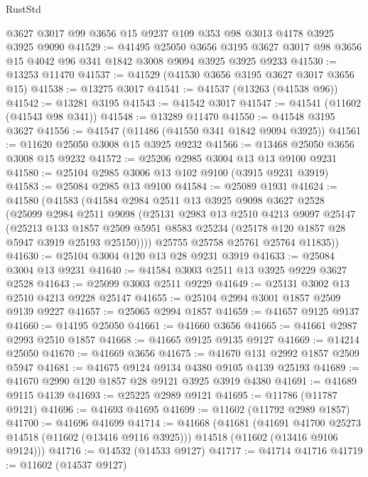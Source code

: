 \begin{lexlean}{RustStd}
\begin{coremodule}
    @3627
    @3017
    @99
    @3656
    @15
    @9237
    @109
    @353
    @98
    @3013
    @4178
    @3925
    @3925
    @9090
@41529 := @41495
    @25050
    @3656
    @3195
    @3627
    @3017
    @98
    @3656
    @15
    @4042
    @96
    @341
    @1842
    @3008
    @9094
    @3925
    @3925
    @9233
@41530 := @13253 @11470
@41537 := @41529 (@41530 @3656 @3195 @3627 @3017 @3656 @15)
@41538 := @13275 @3017
@41541 := @41537 (@13263 (@41538 @96))
@41542 := @13281 @3195
@41543 := @41542 @3017
@41547 := @41541 (@11602 (@41543 @98 @341))
@41548 := @13289 @11470
@41550 := @41548 @3195 @3627
@41556 := @41547 (@11486 (@41550 @341 @1842 @9094 @3925))
@41561 := @11620 @25050 @3008 @15 @3925 @9232
@41566 := @13468 @25050 @3656 @3008 @15 @9232
@41572 := @25206 @2985 @3004 @13 @13 @9100 @9231
@41580 := @25104 @2985 @3006 @13 @102 @9100 (@3915 @9231 @3919)
@41583 := @25084 @2985 @13 @9100
@41584 := @25089 @1931
@41624 := @41580
    (@41583
      (@41584
        @2984
        @2511
        @13
        @3925
        @9098
        @3627
        @2528
        (@25099
          @2984
          @2511
          @9098
          (@25131
            @2983
            @13
            @2510
            @4213
            @9097
            @25147
            (@25213
              @133
              @1857
              @2509
              @5951
              @8583
              @25234
              (@25178 @120 @1857 @28 @5947 @3919 @25193 @25150))))
        @25755
        @25758
        @25761
        @25764
        @11835))
@41630 := @25104 @3004 @120 @13 @28 @9231 @3919
@41633 := @25084 @3004 @13 @9231
@41640 := @41584 @3003 @2511 @13 @3925 @9229 @3627 @2528
@41643 := @25099 @3003 @2511 @9229
@41649 := @25131 @3002 @13 @2510 @4213 @9228 @25147
@41655 := @25104 @2994 @3001 @1857 @2509 @9139 @9227
@41657 := @25065 @2994 @1857
@41659 := @41657 @9125 @9137
@41660 := @14195 @25050
@41661 := @41660 @3656
@41665 := @41661 @2987 @2993 @2510 @1857
@41668 := @41665 @9125 @9135 @9127
@41669 := @14214 @25050
@41670 := @41669 @3656
@41675 := @41670 @131 @2992 @1857 @2509 @5947
@41681 := @41675 @9124 @9134 @4380 @9105 @4139 @25193
@41689 := @41670 @2990 @120 @1857 @28 @9121 @3925 @3919 @4380
@41691 := @41689 @9115 @4139
@41693 := @25225 @2989 @9121
@41695 := @11786 (@11787 @9121)
@41696 := @41693 @41695
@41699 := @11602 (@11792 @2989 @1857)
@41700 := @41696 @41699
@41714 := @41668
    (@41681
      (@41691 @41700 @25273 @14518 (@11602 (@13416 @9116 @3925)))
      @14518
      (@11602 (@13416 @9106 @9124)))
@41716 := @14532 (@14533 @9127)
@41717 := @41714 @41716
@41719 := @11602 (@14537 @9127)

\end{coremodule}
\end{lexlean}
